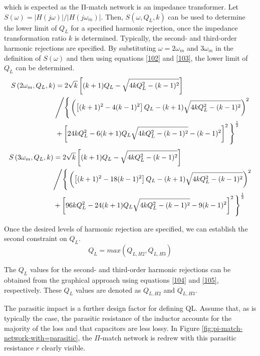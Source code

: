 which is expected as the Π-match network is an impedance transformer. Let $S(\omega) = \left|H(j\omega)\right|/\left|H(j\omega_m)\right|$. Then, $S(\omega, Q_L, k)$ can be used to determine the lower limit of $Q_L$ for a specified harmonic rejection, once the impedance transformation ratio $k$ is determined. Typically, the second- and third-order harmonic rejections are specified. By substituting $\omega = 2\omega_m$ and $3\omega_m$ in the definition of $S(\omega)$ and then using equations \eqref{102} and \eqref{103}, the lower limit of $Q_L$ can be determined.
\begin{equation}
    \begin{aligned}
        S\left(2\omega_m, Q_L, k\right)&=2\sqrt{k}\left[(k+1)Q_L-\sqrt{4kQ_L^2-(k-1)^2} \right]\\
        &\text{\Bigg /}\Bigg\{\left(\left[(k+1)^2-4(k-1)^2 \right]Q_L-(k+1)\sqrt{4kQ_L^2-(k-1)^2} \right)^2\\
        &+\left[24kQ_L^2-6(k+1)Q_L\sqrt{4kQ_L^2-(k-1)^2}-(k-1)^2 \right]^2\Bigg\}^{\frac{1}{2}}
    \end{aligned}
    \label{104}
\end{equation}
    \begin{equation}
    \begin{aligned}
        S\left(3\omega_m, Q_L, k\right)&=2\sqrt{k}\left[(k+1)Q_L-\sqrt{4kQ_L^2-(k-1)^2} \right]\\
        &\text{\Bigg /}\Bigg\{\left(\left[(k+1)^2-18(k-1)^2 \right]Q_L-(k+1)\sqrt{4kQ_L^2-(k-1)^2} \right)^2\\
        &+\left[96kQ_L^2-24(k+1)Q_L\sqrt{4kQ_L^2-(k-1)^2} -9(k-1)^2 \right]^2\Bigg\}^{\frac{1}{2}}
    \end{aligned}
    \label{105}
\end{equation}

Once the desired levels of harmonic rejection are specified, we can establish the second constraint on $Q_L$.
\begin{equation}
    Q_L=max\left(Q_{L,H2}, Q_{L,H3}\right)\label{106}
\end{equation}

The $Q_L$ values for the second- and third-order harmonic rejections can be obtained from the graphical approach using equations \eqref{104} and \eqref{105}, respectively. These $Q_L$ values are denoted as $Q_{L,H2}$ and $Q_{L,H3}$.

The parasitic impact is a further design factor for defining QL. Assume that, as is typically the case, the parasitic resistance of the inductor accounts for the majority of the loss and that capacitors are less lossy. In Figure \ref{fig:pi-match-network-with=parasitic}, the $\Pi$-match network is redrew with this parasitic resistance $r$ clearly visible.

